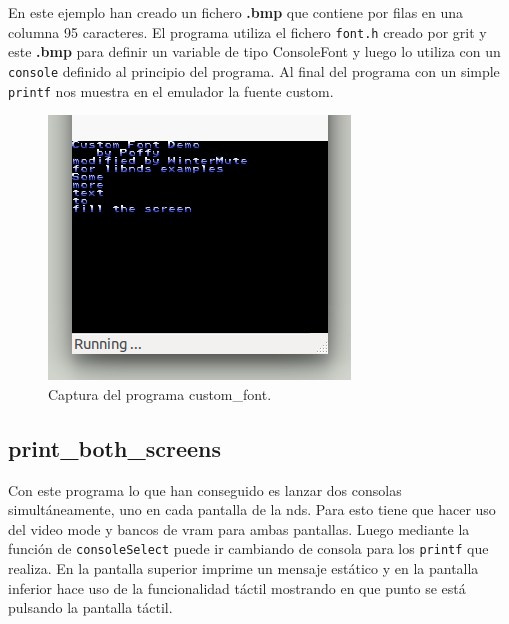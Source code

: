 \documentclass[12pt,english]{article}
\begin{document}
    En este ejemplo han creado un fichero \textbf{.bmp} que contiene por filas en una columna 95 caracteres. El programa utiliza el fichero \texttt{font.h} creado por grit y este \textbf{.bmp} para definir un variable de tipo ConsoleFont y luego lo utiliza con un \texttt{console} definido al principio del programa. Al final del programa con un simple \texttt{printf} nos muestra en el emulador la fuente custom.

    \begin{figure}[H] 
    \centering
    \includegraphics[scale=0.5]{images/custom_font}
    \caption{Captura del programa custom\_font.}
    \end{figure}

    \newpage

    \subsection{print\_both\_screens}

    Con este programa lo que han conseguido es lanzar dos consolas simultáneamente, uno en cada pantalla de la nds. Para esto tiene que hacer uso del video mode y bancos de vram para ambas pantallas. Luego mediante la función de \texttt{consoleSelect} puede ir cambiando de consola para los \texttt{printf} que realiza. En la pantalla superior imprime un mensaje estático y en la pantalla inferior hace uso de la funcionalidad táctil mostrando en que punto se está pulsando la pantalla táctil.
\end{document}
